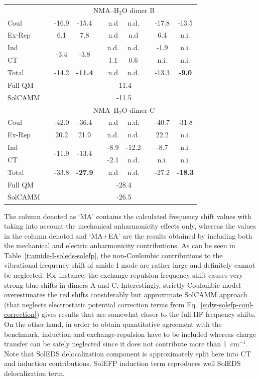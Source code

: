 \documentclass[a4paper,titlepage,twoside,fleqn,12pt]{book}
\begin{document}
\begin{refsection}
\begin{table}[t!]
\begin{tabular*}{1.0\textwidth}{@{\extracolsep{\fill} } l ccccccccc }
%
 && \multicolumn{8}{c}{NMA--H$_2$O dimer B} \\
\cline{3-10}
Coul   &&  -16.9 & -15.4 && n.d   &  n.d. && -17.8 & -13.5 \\
Ex-Rep &&   6.1  &   7.8 && n.d   &  n.d  &&  6.4 &  n.i. \\
Ind    &&  \multirow{2}{*}{-3.4} & \multirow{2}{*}{-3.8} && n.d. & n.d. && -1.9 & n.i. \\
CT     &&       &       &&  1.1  &  0.6   &&   n.i.&  n.i. \\
Total  && -14.2 & \bf{-11.4} &&  n.d  &  n.d.  && -13.3 & \bf{-9.0} \\
Full QM&& \multicolumn{8}{c}{-11.4} \\
SolCAMM&& \multicolumn{8}{c}{-11.5} \\
%
 && \multicolumn{8}{c}{NMA--H$_2$O dimer C} \\
\cline{3-10}
Coul   && -42.0 & -36.4 &&   n.d  &  n.d. && -40.7 & -31.8 \\
Ex-Rep &&  20.2 &  21.9 &&   n.d. &  n.d. &&  22.2 &  n.i. \\
Ind    &&  \multirow{2}{*}{-11.9} & \multirow{2}{*}{-13.4} && -8.9 & -12.2 && -8.7 & n.i. \\
CT     &&       &       &&  -2.1  &  n.d. &&  n.i. &  n.i. \\
Total  && -33.8 & \bf{-27.9} &&   n.d  &  n.d. && -27.2 & \bf{-18.3} \\
Full QM&& \multicolumn{8}{c}{-28.4} \\
SolCAMM&& \multicolumn{8}{c}{-26.5} \\
\hline\hline
\end{tabular*}
\end{table}
%
The
column denoted as `MA' contains the calculated frequency
shift values with taking into account the mechanical anharmonicity
effects only, whereas the
values in the column denoted and `MA+EA' are the results obtained
by including both the mechanical and electric anharmonicity
contributions. As can be seen in Table~\ref{t:amide-I-soleds-solefp}, 
the non\hyp{}Coulombic contributions to the vibrational frequency shift
of amide I mode are rather large and definitely cannot be neglected.
For instance, the exchange\hyp{}repulsion frequency shift causes very
strong blue shifts in dimers A and C. Interestingly, strictly Coulombic
model
overestimates the red shifts considerably but approximate SolCAMM approach
(that neglects electrostatic potential correction terms from Eq.~\eqref{e:dw-solefp-coul-correction})
gives results that are somewhat closer to the full HF frequency shifts.
On the other hand, in order to obtain
quantitative agreement with the benchmark, induction and exchange\hyp{}repulsion
have to be included whereas charge transfer can be safely neglected since it does
not contribute more than 1~cm$^{-1}$. Note that SolEDS delocalization component
is approximately split here into CT and induction contributions. SolEFP induction
term reproduces well SolEDS delocalization term.


\end{refsection}
\end{document}
